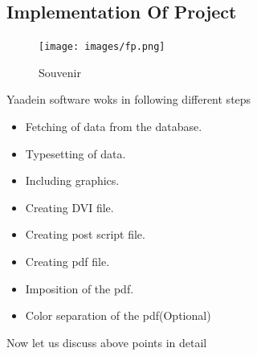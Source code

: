 \subsection{Implementation Of Project}
\begin{figure}[h!]
\centering
\texttt{[image: images/fp.png]}
\caption{Souvenir}
\end{figure}
Yaadein software woks in following different steps
\begin{itemize}
\item Fetching of data from the database.
\item Typesetting of data.
\item Including graphics.
\item Creating DVI file.
\item Creating post script file.
\item Creating pdf file.
\item Imposition of the pdf.
\item Color separation of the pdf(Optional)
\end{itemize}
Now let us discuss above points in detail
